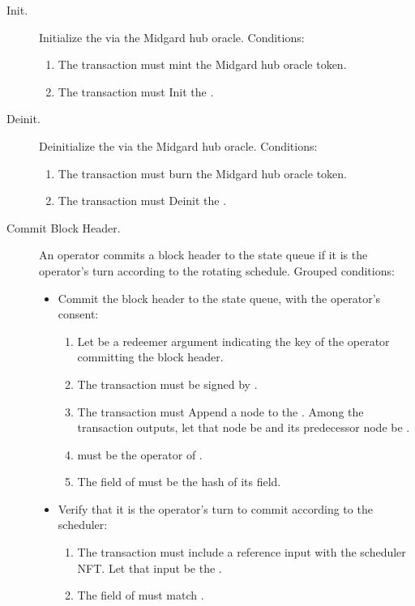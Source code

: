 \documentclass[../midgard.tex]{subfiles}
\begin{document}
\begin{description}
    \item[Init.] Initialize the  via the Midgard hub oracle.
      Conditions:
        \begin{enumerate}
            \item The transaction must mint the Midgard hub oracle token.
            \item The transaction must Init the .
        \end{enumerate}

    \item[Deinit.] Deinitialize the  via the Midgard hub oracle.
      Conditions:
        \begin{enumerate}
            \item The transaction must burn the Midgard hub oracle token.
            \item The transaction must Deinit the .
        \end{enumerate}

    \item[Commit Block Header.] An operator commits a block header to the state queue if it is the operator's turn according to the rotating schedule.
      Grouped conditions:
        \begin{itemize}
            \item Commit the block header to the state queue, with the operator's consent:
            \begin{enumerate}
                \item Let  be a redeemer argument indicating the key of the operator committing the block header.
                \item The transaction must be signed by .
                \item The transaction must Append a node to the .
                  Among the transaction outputs, let that node be  and its predecessor node be .
                \item {} must be the operator of .
                \item The  field of  must be the hash of its  field.
            \end{enumerate}

            \item Verify that it is the operator's turn to commit according to the scheduler:
            \begin{enumerate}[resume]
                \item The transaction must include a reference input with the scheduler NFT.
                  Let that input be the .
                \item The  field of  must match .
            \end{enumerate}


\end{itemize}
\end{description}
\end{document}
